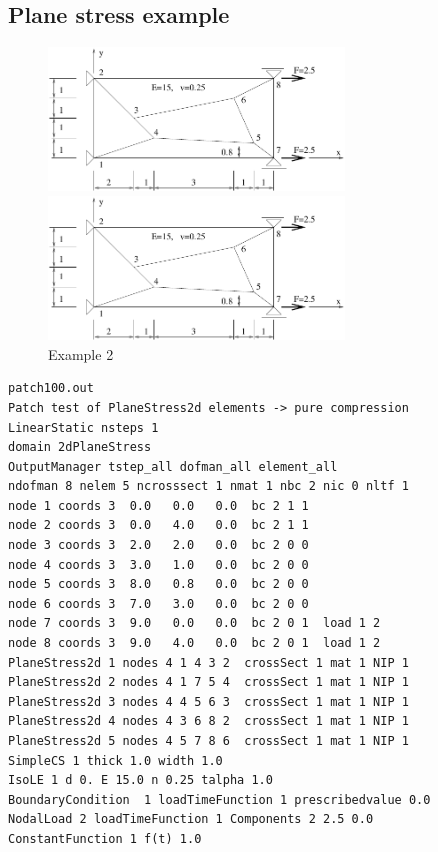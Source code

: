\documentclass[a4paper]{article}
\begin{document}
\subsection {Plane stress example}
\begin{figure}[htb]
\begin{htmlonly}
  \centerline{\includegraphics[width=0.7\textwidth]{ex02}}
\end{htmlonly}
\centerline{\includegraphics[width=0.7\textwidth]{ex02}}
\caption{Example 2}
\label{ex02}
\end{figure}
{\small\begin{verbatim}
patch100.out
Patch test of PlaneStress2d elements -> pure compression
LinearStatic nsteps 1
domain 2dPlaneStress
OutputManager tstep_all dofman_all element_all
ndofman 8 nelem 5 ncrosssect 1 nmat 1 nbc 2 nic 0 nltf 1
node 1 coords 3  0.0   0.0   0.0  bc 2 1 1
node 2 coords 3  0.0   4.0   0.0  bc 2 1 1
node 3 coords 3  2.0   2.0   0.0  bc 2 0 0
node 4 coords 3  3.0   1.0   0.0  bc 2 0 0
node 5 coords 3  8.0   0.8   0.0  bc 2 0 0
node 6 coords 3  7.0   3.0   0.0  bc 2 0 0
node 7 coords 3  9.0   0.0   0.0  bc 2 0 1  load 1 2
node 8 coords 3  9.0   4.0   0.0  bc 2 0 1  load 1 2
PlaneStress2d 1 nodes 4 1 4 3 2  crossSect 1 mat 1 NIP 1
PlaneStress2d 2 nodes 4 1 7 5 4  crossSect 1 mat 1 NIP 1
PlaneStress2d 3 nodes 4 4 5 6 3  crossSect 1 mat 1 NIP 1
PlaneStress2d 4 nodes 4 3 6 8 2  crossSect 1 mat 1 NIP 1
PlaneStress2d 5 nodes 4 5 7 8 6  crossSect 1 mat 1 NIP 1
SimpleCS 1 thick 1.0 width 1.0
IsoLE 1 d 0. E 15.0 n 0.25 talpha 1.0
BoundaryCondition  1 loadTimeFunction 1 prescribedvalue 0.0
NodalLoad 2 loadTimeFunction 1 Components 2 2.5 0.0
ConstantFunction 1 f(t) 1.0
\end{verbatim}}
\end{document}
